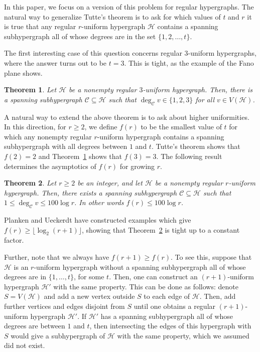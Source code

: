 \documentclass[11pt, a4paper]{article}
\newtheorem{theorem}{Theorem}
\numberwithin{theorem}{section} %
\theoremstyle{remark}
\theoremstyle{definition}
\def\cC{\mathcal{C}}
\def\cH{\mathcal{H}}
\begin{document}
In this paper, we focus on a version of this problem for regular hypergraphs. The natural way to generalize Tutte's theorem is to ask for which values of $t$ and $r$ it is true that any regular $r$-uniform hypergraph $\cH$ contains a spanning subhypergraph all of whose degrees are in the set $\{1, 2, \dots, t\}$.

The first interesting case of this question concerns regular $3$-uniform hypergraphs, where the answer turns out to be $t=3$. This is tight, as the example of the Fano plane shows.

\begin{theorem}\label{thm:3-uniform}
Let $\cH$ be a nonempty regular $3$-uniform hypergraph. Then, there is a spanning subhypergraph $\cC\subseteq \cH$ such that $\deg_{\cC} v\in \{1, 2, 3\}$ for all $v\in V(\cH)$.
\end{theorem}

A natural way to extend the above theorem is to ask about higher uniformities. In this direction, for $r\geq 2$, we define $f(r)$ to be the smallest value of $t$ for which any nonempty regular $r$-uniform hypergraph contains a spanning subhypergraph with all degrees between $1$ and $t$. Tutte's theorem shows that $f(2)=2$ and Theorem~\ref{thm:3-uniform} shows that $f(3)=3$. The following result determines the asymptotics of $f(r)$ for growing $r$.

\begin{theorem}\label{thm:r-uniform}
Let $r\geq 2$ be an integer, and let $\cH$ be a nonempty regular $r$-uniform hypergraph. Then, there exists a spanning subhypergraph $\cC\subseteq \cH$ such that $1\leq \deg_{\cC} v\leq 100\log r$. In other words $f(r)\leq 100\log r$.
\end{theorem}

Planken and Ueckerdt \cite{PlankenUeckerdt23} have constructed examples which give $f(r)\geq \lfloor \log_2(r+1)\rfloor $, showing that Theorem~\ref{thm:r-uniform} is tight up to a constant factor.

Further, note that we always have $f(r+1)\geq f(r)$. To see this, suppose that $\cH$ is an $r$-uniform hypergraph without a spanning subhypergraph all of whose degrees are in $\{1, \dots, t\}$, for some $t$. Then, one can construct an $(r+1)$-uniform hypergraph $\cH'$ with the same property. This can be done as follows: denote $S=V(\cH)$ and add a new vertex outside $S$ to each edge of $\cH$. Then, add further vertices and edges disjoint from $S$ until one obtains a regular $(r+1)$-uniform hypergraph $\cH'$. If $\cH'$ has a spanning subhypergraph all of whose degrees are between $1$ and $t$, then intersecting the edges of this hypergraph with $S$ would give a subhypergraph of $\cH$ with the same property, which we assumed did not exist.
\end{document}
